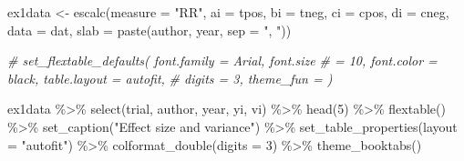 \documentclass[
  11pt,
]{article}
\newenvironment{Shaded}{\begin{snugshade}}{\end{snugshade}}
\newcommand{\AttributeTok}[1]{\textcolor[rgb]{0.77,0.63,0.00}{#1}}
\newcommand{\CommentTok}[1]{\textcolor[rgb]{0.56,0.35,0.01}{\textit{#1}}}
\newcommand{\DecValTok}[1]{\textcolor[rgb]{0.00,0.00,0.81}{#1}}
\newcommand{\FunctionTok}[1]{\textcolor[rgb]{0.00,0.00,0.00}{#1}}
\newcommand{\NormalTok}[1]{#1}
\newcommand{\OtherTok}[1]{\textcolor[rgb]{0.56,0.35,0.01}{#1}}
\newcommand{\SpecialCharTok}[1]{\textcolor[rgb]{0.00,0.00,0.00}{#1}}
\newcommand{\StringTok}[1]{\textcolor[rgb]{0.31,0.60,0.02}{#1}}
\begin{document}
\begin{Shaded}
\begin{Highlighting}[]
\NormalTok{ex1data }\OtherTok{\textless{}{-}} \FunctionTok{escalc}\NormalTok{(}\AttributeTok{measure =} \StringTok{"RR"}\NormalTok{, }\AttributeTok{ai =}\NormalTok{ tpos, }\AttributeTok{bi =}\NormalTok{ tneg, }\AttributeTok{ci =}\NormalTok{ cpos,}
    \AttributeTok{di =}\NormalTok{ cneg, }\AttributeTok{data =}\NormalTok{ dat, }\AttributeTok{slab =} \FunctionTok{paste}\NormalTok{(author, year, }\AttributeTok{sep =} \StringTok{", "}\NormalTok{))}

\CommentTok{\# set\_flextable\_defaults( font.family = \textquotesingle{}Arial\textquotesingle{}, font.size}
\CommentTok{\# = 10, font.color = \textquotesingle{}black\textquotesingle{}, table.layout = \textquotesingle{}autofit\textquotesingle{},}
\CommentTok{\# digits = 3, theme\_fun = \textquotesingle{}\textquotesingle{} )}

\NormalTok{ex1data }\SpecialCharTok{\%\textgreater{}\%}
    \FunctionTok{select}\NormalTok{(trial, author, year, yi, vi) }\SpecialCharTok{\%\textgreater{}\%}
    \FunctionTok{head}\NormalTok{(}\DecValTok{5}\NormalTok{) }\SpecialCharTok{\%\textgreater{}\%}
    \FunctionTok{flextable}\NormalTok{() }\SpecialCharTok{\%\textgreater{}\%}
    \FunctionTok{set\_caption}\NormalTok{(}\StringTok{"Effect size and variance"}\NormalTok{) }\SpecialCharTok{\%\textgreater{}\%}
    \FunctionTok{set\_table\_properties}\NormalTok{(}\AttributeTok{layout =} \StringTok{"autofit"}\NormalTok{) }\SpecialCharTok{\%\textgreater{}\%}
    \FunctionTok{colformat\_double}\NormalTok{(}\AttributeTok{digits =} \DecValTok{3}\NormalTok{) }\SpecialCharTok{\%\textgreater{}\%}
    \FunctionTok{theme\_booktabs}\NormalTok{()}
\end{Highlighting}
\end{Shaded}

\providecommand{\docline}[3]{\noalign{\global\setlength{\arrayrulewidth}{#1}}\arrayrulecolor[HTML]{#2}\cline{#3}}

\setlength{\tabcolsep}{2pt}

\renewcommand*{\arraystretch}{1.5}
\end{document}

